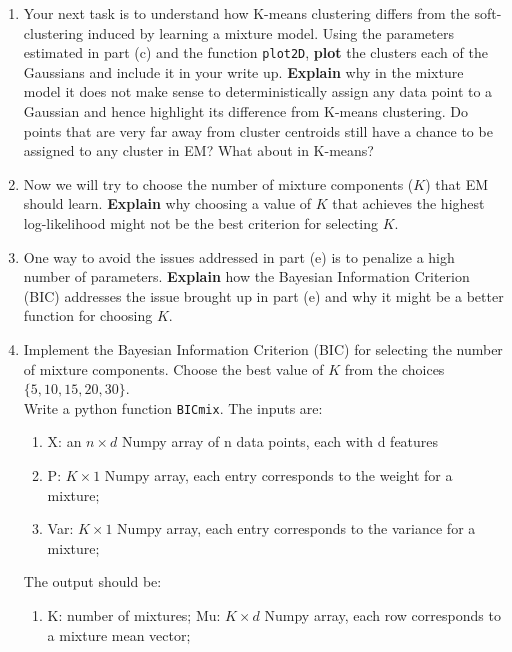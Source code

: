 \begin{enumerate}
\begin{enumerate}
\item Your next task is to understand how K-means clustering differs from the soft-clustering induced by learning a mixture model. Using the parameters estimated in part (c) and the function \texttt{plot2D}, \textbf{plot} the clusters each of the  Gaussians and include it in your write up. \textbf{Explain} why in the mixture model it does not make sense to deterministically assign any data point to a Gaussian and hence highlight its difference from K-means clustering. Do points that are very far away from cluster centroids still have a chance to be assigned to any cluster in EM? What about in K-means?\\

\item Now we will try to choose the number of mixture components ($K$) that EM should learn. \textbf{Explain} why choosing a value of $K$ that achieves the highest log-likelihood might not be the best criterion for selecting $K$.

\item One way to avoid the issues addressed in part (e) is to penalize a high number of parameters. \textbf{Explain} how the Bayesian Information Criterion (BIC) addresses the issue brought up in part (e) and why it might be a better function for choosing $K$.

\item Implement the Bayesian Information Criterion (BIC) for selecting the number of mixture components. Choose the best value of $K$ from the choices $\{ 5, 10, 15, 20 , 30\}$.\\
    Write a python function \texttt{BICmix}. The inputs are:
    \begin{enumerate}
    \item X: an $n \times d$ Numpy array of n data points, each with d features
    \item P: $K \times 1$ Numpy array, each entry corresponds to the weight for a mixture;
    \item Var: $K \times 1$ Numpy array, each entry corresponds to the variance for a mixture;
    \end{enumerate}
    The output should be:
    \begin{enumerate}
    \item K: number of mixtures; Mu: $K \times d$ Numpy array, each row corresponds to a mixture mean vector;
    \end{enumerate}
    
\end{enumerate}


\end{enumerate}
